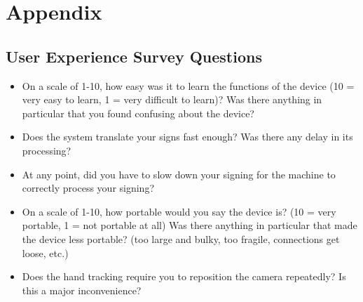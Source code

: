 \documentclass[12pt]{article}
\begin{document}
					
					
					

					
					
					
					





				




\newpage

\section{Appendix}

\subsection{User Experience Survey Questions}
\begin{itemize}
  \item On a scale of 1-10, how easy was it to learn the functions of the device (10 = very easy to learn, 1 = very difficult to learn)? Was there anything in 
  particular that you found confusing about the device?
  \item Does the system translate your signs fast enough? Was there any delay in its processing?
  \item At any point, did you have to slow down your signing for the machine to correctly process your signing?
  \item On a scale of 1-10, how portable would you say the device is? (10 = very portable, 1 = not portable at all) Was there anything in particular that made 
  the device less portable? (too large and bulky, too fragile, connections get loose, etc.)
  \item Does the hand tracking require you to reposition the camera repeatedly? Is this a major inconvenience?
\end{itemize}
\end{document}
